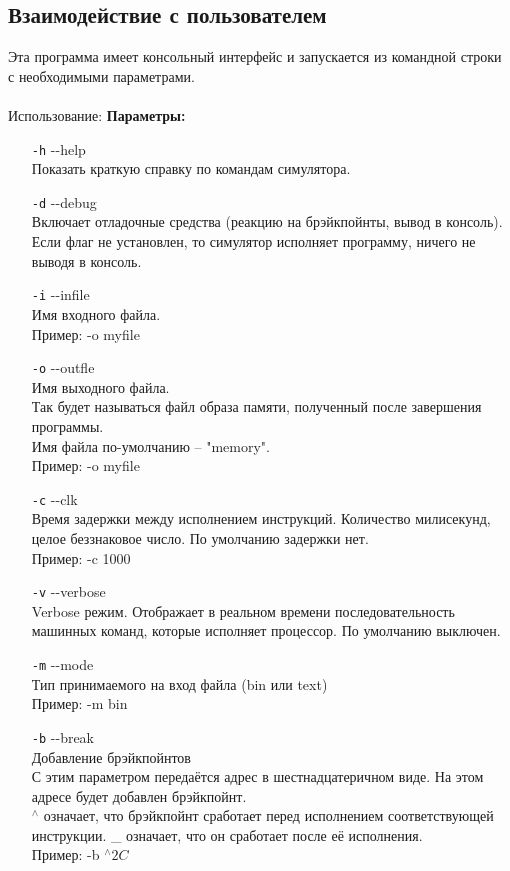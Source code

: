 \subsection{Взаимодействие с пользователем}
Эта программа имеет консольный интерфейс и запускается из командной строки с необходимыми параметрами.\\
~\\
Использование:
{\bf Параметры:}
\begin{enumerate}
	\item[{\tt -h}] {-}-help \\
	Показать краткую справку по командам симулятора.
	
	\item[{\tt -d}] {-}-debug \\
	Включает отладочные средства (реакцию на брэйкпойнты, вывод в консоль).
	Если флаг не  установлен, то симулятор исполняет программу, ничего не выводя в консоль.
	
	\item[{\tt -i}] {-}-infile \\
	Имя входного файла. \\
	Пример: -o myfile
	
	\item[{\tt -o}] {-}-outfle \\
	Имя выходного файла. \\ 
	Так будет называться файл образа памяти, полученный после завершения программы.\\
	Имя файла по-умолчанию -- "memory".\\
	Пример: -o myfile
	
	\item[{\tt -c}] {-}-clk \\
	Время задержки между исполнением инструкций. Количество милисекунд, целое беззнаковое число. По умолчанию задержки нет.\\
	Пример: -c 1000
	
	\item[{\tt -v}] {-}-verbose \\
	Verbose режим. Отображает в реальном времени последовательность машинных команд, которые исполняет процессор. По умолчанию выключен.
	
	\item[{\tt -m}] {-}-mode \\
	Тип принимаемого на вход файла (bin или text) \\
	Пример: -m bin
	
	\item[{\tt -b}] {-}-break \\
	Добавление брэйкпойнтов \\
	С этим параметром передаётся адрес в шестнадцатеричном виде. На этом адресе будет добавлен брэйкпойнт. \\
	$^\wedge$ означает, что брэйкпойнт сработает перед исполнением соответствующей инструкции. \_ означает, что он сработает после её исполнения. \\
	Пример: -b $^\wedge2C$
	

\end{enumerate}
